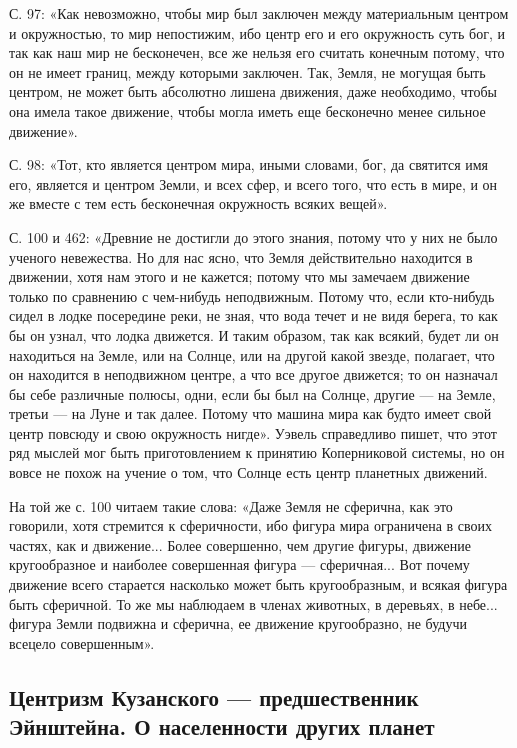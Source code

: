 С. 97: «Как невозможно, чтобы мир был заключен между материальным
центром и окружностью, то мир непостижим, ибо центр его и его
окружность суть бог, и так как наш мир не бесконечен, все же нельзя
его считать конечным потому, что он не имеет границ, между которыми
заключен. Так, Земля, не могущая быть центром, не может быть абсолютно
лишена движения, даже необходимо, чтобы она имела такое движение,
чтобы могла иметь еще бесконечно менее сильное движение».

С. 98: «Тот, кто является центром мира, иными словами, бог, да
святится имя его, является и центром Земли, и всех сфер, и всего того,
что есть в мире, и он же вместе с тем есть бесконечная окружность
всяких вещей».

С. 100 и 462: «Древние не достигли до этого знания, потому что у них
не было ученого невежества. Но для нас ясно, что Земля действительно
находится в движении, хотя нам этого и не кажется; потому что мы
замечаем движение только по сравнению с чем-нибудь неподвижным. Потому
что, если кто-нибудь сидел в лодке посередине реки, не зная, что вода
течет и не видя берега, то как бы он узнал, что лодка движется. И
таким образом, так как всякий, будет ли он находиться на Земле, или на
Солнце, или на другой какой звезде, полагает, что он находится в
неподвижном центре, а что все другое движется; то он назначал бы себе
различные полюсы, одни, если бы был на Солнце, другие --- на Земле,
третьи --- на Луне и так далее. Потому что машина мира как будто имеет
свой центр повсюду и свою окружность нигде». Уэвель справедливо пишет,
что этот ряд мыслей мог быть приготовлением к принятию Коперниковой
системы, но он вовсе не похож на учение о том, что Солнце есть центр
планетных движений.

На той же с. 100 читаем такие слова: «Даже Земля не сферична, как это
говорили, хотя стремится к сферичности, ибо фигура мира ограничена в
своих частях, как и движение... Более совершенно, чем другие фигуры,
движение кругообразное и наиболее совершенная фигура --- сферичная...
Вот почему движение всего старается насколько может быть
кругообразным, и всякая фигура быть сферичной. То же мы наблюдаем в
членах животных, в деревьях, в небе... фигура Земли подвижна и
сферична, ее движение кругообразно, не будучи всецело совершенным».

\subsection{Центризм Кузанского --- предшественник Эйнштейна. О
населенности других планет}

